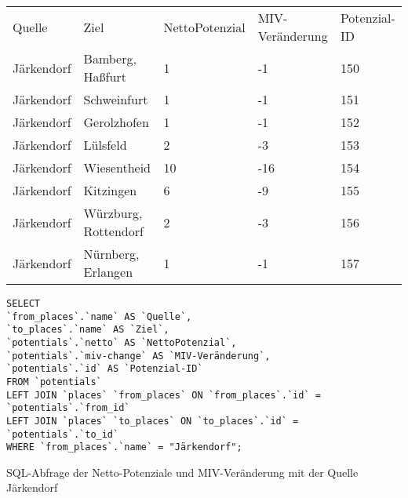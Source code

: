 \begin{tabularx}{\textwidth}{*5{X}}
Quelle & Ziel & NettoPotenzial & MIV-Veränderung & Potenzial-ID\\ 
Järkendorf & Bamberg, Haßfurt & 1 & -1 & 150\\ 
Järkendorf & Schweinfurt & 1 & -1 & 151\\ 
Järkendorf & Gerolzhofen & 1 & -1 & 152\\ 
Järkendorf & Lülsfeld & 2 & -3 & 153\\ 
Järkendorf & Wiesentheid & 10 & -16 & 154\\ 
Järkendorf & Kitzingen & 6 & -9 & 155\\ 
Järkendorf & Würzburg, Rottendorf & 2 & -3 & 156\\ 
Järkendorf & Nürnberg, Erlangen & 1 & -1 & 157\\ 
\end{tabularx}
\newline
\newline
\begin{listing}[htbp]
\begin{verbatim}
SELECT
`from_places`.`name` AS `Quelle`, 
`to_places`.`name` AS `Ziel`, 
`potentials`.`netto` AS `NettoPotenzial`, 
`potentials`.`miv-change` AS `MIV-Veränderung`, 
`potentials`.`id` AS `Potenzial-ID`
FROM `potentials`
LEFT JOIN `places` `from_places` ON `from_places`.`id` = `potentials`.`from_id`
LEFT JOIN `places` `to_places` ON `to_places`.`id` = `potentials`.`to_id`
WHERE `from_places`.`name` = "Järkendorf";
\end{verbatim}
\caption{SQL-Abfrage der Netto-Potenziale und MIV-Veränderung mit der Quelle Järkendorf}\label{lst-fz-jaerkendorf}
\end{listing}